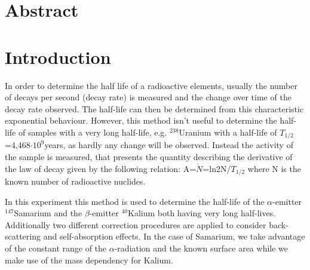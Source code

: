 \documentclass[12pt]{article}
\title{\vspace{0cm}{\Huge Fortgeschrittenen-Praktikum I:\\ \vspace{1cm} LHWZ}}
\author{Saskia Bondza\\Simon Stephan}
\date{Durchgeführt am 02.09.2016 und 05.09.2016}
\begin{document}
\maketitle
\newpage

\section*{Abstract}

\newpage

\thispagestyle{empty}
\tableofcontents
\newpage

\section{Introduction}
In order to determine the half life of a radioactive elements, usually the number of decays per second (decay rate) is measured and the change over time of the decay rate observed. The half-life can then be determined from this characteristic exponential behaviour. However, this method isn't useful to determine the half-life of samples with a very long half-life, e.g. ${}^{238}$Uranium with a half-life of $T_{1/2}$=4,468$\cdot 10^9$years,  as hardly any change will be observed. Instead the activity of the sample is measured, that presents the quantity describing the derivative of the law of decay given by the following relation: A=$\dot{N}$=ln2N/$T_{1/2}$ where N is the known number of radioactive nuclides.


In this experiment this method is used to determine the half-life of the $\alpha$-emitter ${}^{147}$Samarium and the $\beta$-emitter ${}^{40}$Kalium both having very long half-lives. Additionally two different correction procedures are applied to consider back-scattering and self-absorption effects. 
In the case of Samarium, we take advantage of the constant range of the  $\alpha$-radiation and the known surface area while we make use of the mass dependency for Kalium.
\end{document}
